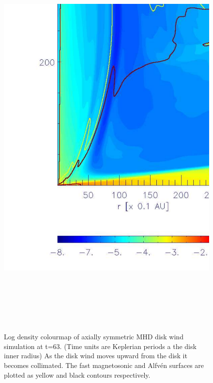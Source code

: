 \begin{figure}[t]
\centering
\includegraphics[height=21cm]{finalthes}
\caption{
Log density colourmap of axially symmetric MHD disk wind simulation at t=63.
(Time units are Keplerian periods a the disk inner radius)
As the disk wind moves upward from the disk it becomes collimated.
The fast magnetosonic and Alfv\'en surfaces are plotted as yellow and black
contours respectively.
}
\label{fig:MHDDiskWind} %
\end{figure}







